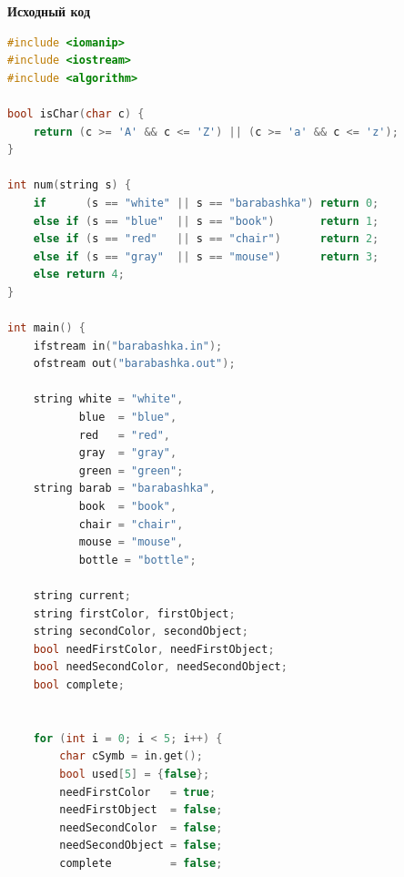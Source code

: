 \documentclass[a4paper,12pt]{article}
\begin{document}
\textbf{{\large Исходный код}} \\
\begin{lstlisting}[language=C++]
#include <iomanip>
#include <iostream>
#include <algorithm>

bool isChar(char c) {
    return (c >= 'A' && c <= 'Z') || (c >= 'a' && c <= 'z');
}

int num(string s) {
    if      (s == "white" || s == "barabashka") return 0;
    else if (s == "blue"  || s == "book")       return 1;
    else if (s == "red"   || s == "chair")      return 2;
    else if (s == "gray"  || s == "mouse")      return 3;
    else return 4;
}

int main() {
    ifstream in("barabashka.in");
    ofstream out("barabashka.out");

    string white = "white",
           blue  = "blue",
           red   = "red",
           gray  = "gray",
           green = "green";
    string barab = "barabashka",
           book  = "book",
           chair = "chair",
           mouse = "mouse",
           bottle = "bottle";

    string current;
    string firstColor, firstObject;
    string secondColor, secondObject;
    bool needFirstColor, needFirstObject;
    bool needSecondColor, needSecondObject;
    bool complete;


    for (int i = 0; i < 5; i++) {
        char cSymb = in.get();
        bool used[5] = {false};
        needFirstColor   = true;
        needFirstObject  = false;
        needSecondColor  = false;
        needSecondObject = false;
        complete         = false;


\end{lstlisting}
\end{document}
